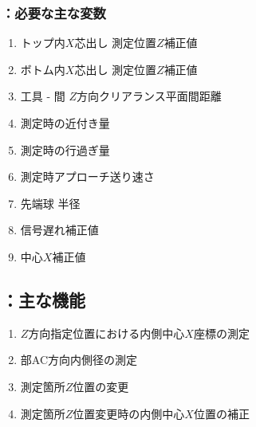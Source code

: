 \subsubsection{\MXIWidth：必要な主な変数}
\begin{enumerate}[label*=\sarrow]
\item トップ内$X$芯出し 測定位置$Z$補正値
\item ボトム内$X$芯出し 測定位置$Z$補正値
\item 工具 - \EndFace 間 $Z$方向クリアランス平面間距離
\item \TouchSensorProbe 測定時の近付き量
\item \TouchSensorProbe 測定時の行過ぎ量
\item \TouchSensorProbe 測定時アプローチ送り速さ
\item \TouchSensorProbe 先端球 半径
\item \TouchSensorProbe 信号遅れ補正値
\item \TouchSensorProbe 中心$X$補正値
\end{enumerate}


\clearpage
\subsection{\MXIWidth：主な機能}
\begin{enumerate}[label*=\sarrow]
\item $Z$方向指定位置における内側中心$X$座標の測定
\item \EndFace 部AC方向内側径の測定
\item 測定箇所$Z$位置の変更
\item 測定箇所$Z$位置変更時の内側中心$X$位置の補正
\end{enumerate}


